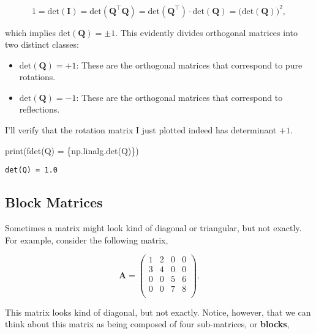 \documentclass[
  letterpaper,
  DIV=11,
  numbers=noendperiod]{scrreprt}
\newenvironment{Shaded}{\begin{snugshade}}{\end{snugshade}}
\newcommand{\BuiltInTok}[1]{\textcolor[rgb]{0.00,0.23,0.31}{#1}}
\newcommand{\NormalTok}[1]{\textcolor[rgb]{0.00,0.23,0.31}{#1}}
\newcommand{\SpecialCharTok}[1]{\textcolor[rgb]{0.37,0.37,0.37}{#1}}
\newcommand{\SpecialStringTok}[1]{\textcolor[rgb]{0.13,0.47,0.30}{#1}}
\providecommand{\tightlist}{%
  \setlength{\itemsep}{0pt}\setlength{\parskip}{0pt}}\usepackage{longtable,booktabs,array}
\begin{document}
\[1 = \text{det}(\mathbf{I}) = \text{det}(\mathbf{Q}^\top \mathbf{Q}) = \text{det}(\mathbf{Q}^\top) \cdot \text{det}(\mathbf{Q}) = \big(\text{det}(\mathbf{Q})\big)^2,\]

which implies \(\text{det}(\mathbf{Q}) = \pm 1\). This evidently divides
orthogonal matrices into two distinct classes:

\begin{itemize}
\tightlist
\item
  \(\text{det}(\mathbf{Q}) = +1\): These are the orthogonal matrices
  that correspond to pure rotations.
\item
  \(\text{det}(\mathbf{Q}) = -1\): These are the orthogonal matrices
  that correspond to reflections.
\end{itemize}

I'll verify that the rotation matrix I just plotted indeed has
determinant \(+1\).

\begin{Shaded}
\begin{Highlighting}[]
\BuiltInTok{print}\NormalTok{(}\SpecialStringTok{f\textquotesingle{}det(Q) = }\SpecialCharTok{\{}\NormalTok{np}\SpecialCharTok{.}\NormalTok{linalg}\SpecialCharTok{.}\NormalTok{det(Q)}\SpecialCharTok{\}}\SpecialStringTok{\textquotesingle{}}\NormalTok{)}
\end{Highlighting}
\end{Shaded}

\begin{verbatim}
det(Q) = 1.0
\end{verbatim}

\hypertarget{block-matrices}{%
\subsection{Block Matrices}\label{block-matrices}}

Sometimes a matrix might look kind of diagonal or triangular, but not
exactly. For example, consider the following matrix,

\[
\mathbf{A} = 
\begin{pmatrix}
1 & 2 & 0 & 0 \\
3 & 4 & 0 & 0 \\
0 & 0 & 5 & 6 \\
0 & 0 & 7 & 8 \\
\end{pmatrix}.
\]

This matrix looks kind of diagonal, but not exactly. Notice, however,
that we can think about this matrix as being composed of four
sub-matrices, or \textbf{blocks},
\end{document}
